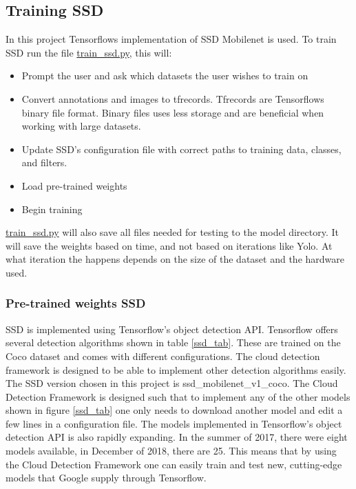 \newpage

\subsection{Training SSD}
In this project Tensorflows implementation of SSD Mobilenet is used. To train SSD run the file \url{train_ssd.py}, this will:

\begin{itemize}
    \item Prompt the user and ask which datasets the user wishes to train on
    \item Convert annotations and images to tfrecords. Tfrecords are Tensorflows binary file format. Binary files uses less storage and are beneficial when working with large datasets.
    \item Update SSD's configuration file with correct paths to training data, classes, and filters.
    \item Load pre-trained weights
    \item Begin training
\end{itemize}

\noindent
\url{train_ssd.py} will also save all files needed for testing to the model directory. It will save the weights based on time, and not based on iterations like Yolo. At what iteration the happens depends on the size of the dataset and the hardware used. 

\subsubsection{Pre-trained weights SSD}
SSD is implemented using Tensorflow's object detection API. Tensorflow offers several detection algorithms shown in table \ref{ssd_tab}. These are trained on the Coco dataset and comes with different configurations. The cloud detection framework is designed to be able to implement other detection algorithms easily. The SSD version chosen in this project is ssd\_mobilenet\_v1\_coco. The Cloud Detection Framework is designed such that to implement any of the other models shown in figure \ref{ssd_tab} one only needs to download another model and edit a few lines in a configuration file. The models implemented in Tensorflow's object detection API is also rapidly expanding. In the summer of 2017, there were eight models available, in December of 2018, there are 25. This means that by using the Cloud Detection Framework one can easily train and test new, cutting-edge models that Google supply through Tensorflow.

